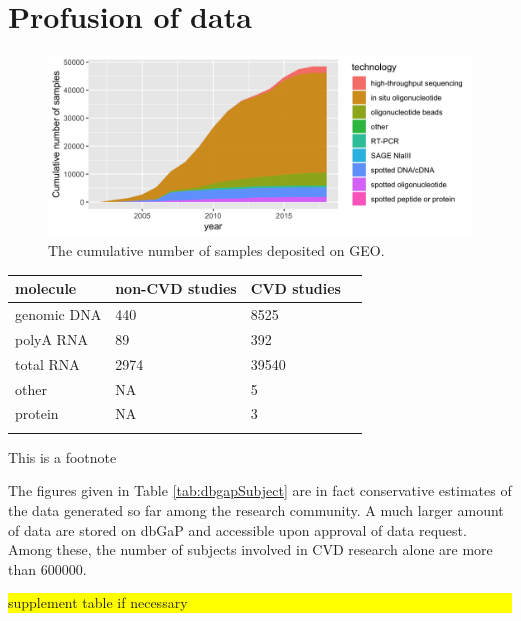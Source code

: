 \documentclass{bioinfo}
\newcommand{\todo}[1]{\colorbox{yellow}{\parbox{1\linewidth}{#1}}}
\begin{document}
\section{Profusion of data}

\begin{figure}[!tpb]%
\includegraphics[width=1\linewidth]{gsm_count_by_tech.png}
	\caption{The cumulative number of samples deposited on GEO.}\label{fig:01}
\end{figure}

\begin{table}[!t]
	 {\begin{tabular}{@{}llll@{}}\toprule 
			molecule &non-CVD studies & CVD studies \\ \midrule
			genomic DNA &            440 &        8525  \\
			polyA RNA &             89 &         392  \\
			total RNA &           2974 &       39540  \\
			other &             NA &           5  \\
			protein &             NA &           3  \\ \botrule
	\end{tabular}}{This is a footnote}
\end{table}

The figures given in Table \ref{tab:dbgapSubject} are in fact conservative estimates of the data generated so far among the research community. A much larger amount of data are stored on dbGaP and accessible upon approval of data request. Among these, the number of subjects involved in CVD research alone are more than 600000. %

\todo{supplement table if necessary}
\end{document}
